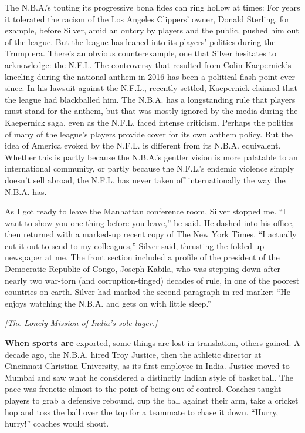 The N.B.A.'s touting its progressive bona fides can ring hollow at
times: For years it tolerated the racism of the Los Angeles Clippers'
owner, Donald Sterling, for example, before Silver, amid an outcry by
players and the public, pushed him out of the league. But the league has
leaned into its players' politics during the Trump era. There's an
obvious counterexample, one that Silver hesitates to acknowledge: the
N.F.L. The controversy that resulted from Colin Kaepernick's kneeling
during the national anthem in 2016 has been a political flash point ever
since. In his lawsuit against the N.F.L., recently settled, Kaepernick
claimed that the league had blackballed him. The N.B.A. has a
longstanding rule that players must stand for the anthem, but that was
mostly ignored by the media during the Kaepernick saga, even as the
N.F.L. faced intense criticism. Perhaps the politics of many of the
league's players provide cover for its own anthem policy. But the idea
of America evoked by the N.F.L. is different from its N.B.A. equivalent.
Whether this is partly because the N.B.A.'s gentler vision is more
palatable to an international community, or partly because the N.F.L.'s
endemic violence simply doesn't sell abroad, the N.F.L. has never taken
off internationally the way the N.B.A. has.

As I got ready to leave the Manhattan conference room, Silver stopped
me. ``I want to show you one thing before you leave,'' he said. He
dashed into his office, then returned with a marked-up recent copy of
The New York Times. ``I actually cut it out to send to my colleagues,''
Silver said, thrusting the folded-up newspaper at me. The front section
included a profile of the president of the Democratic Republic of Congo,
Joseph Kabila, who was stepping down after nearly two war-torn (and
corruption-tinged) decades of rule, in one of the poorest countries on
earth. Silver had marked the second paragraph in red marker: ``He enjoys
watching the N.B.A. and gets on with little sleep.''

\href{https://www.nytimes3xbfgragh.onion/interactive/2018/02/01/magazine/winter-olympics-luge-india.html}{\emph{{[}The
Lonely Mission of India's sole luger.{]}}}

\textbf{When sports are} exported, some things are lost in translation,
others gained. A decade ago, the N.B.A. hired Troy Justice, then the
athletic director at Cincinnati Christian University, as its first
employee in India. Justice moved to Mumbai and saw what he considered a
distinctly Indian style of basketball. The pace was frenetic almost to
the point of being out of control. Coaches taught players to grab a
defensive rebound, cup the ball against their arm, take a cricket hop
and toss the ball over the top for a teammate to chase it down. ``Hurry,
hurry!'' coaches would shout.

